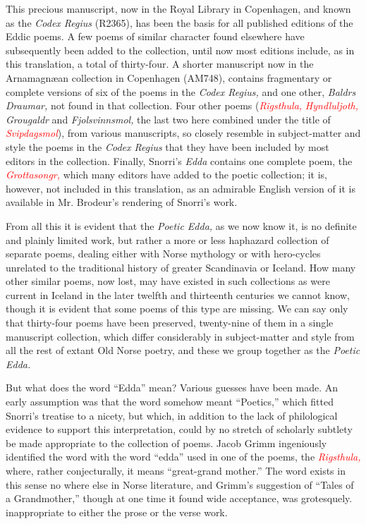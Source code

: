\documentclass{scrbook}
\newcommand{\chapterref}[1]{\textcolor{red}{\emph{#1}}}
\newcommand{\chapterref}[1]{\hyperref[cha:#1]{\emph{#1}}}
\begin{document}
This precious manuscript, now in the Royal Library in Copenhagen, and known as the \emph{Codex Regius} (R2365), has been the basis for all published editions of the Eddic poems. A few poems of similar character found elsewhere have subsequently been added to the collection, until now most editions include, as in this translation, a total of thirty-four. A shorter manuscript now in the Arnamagnæan collection in Copenhagen (AM748), contains fragmentary or complete versions of six of the poems in the \emph{Codex Regius,} and one other, \emph{Baldrs Draumar,} not found in that collection. Four other poems (\chapterref{Rigsthula,} \chapterref{Hyndluljoth,} \emph{Grougaldr} and \emph{Fjolsvinnsmol,} the last two here combined under the title of \chapterref{Svipdagsmol}), from various manuscripts, so closely resemble in subject-matter and style the poems in the \emph{Codex Regius} that they have been included by most editors in the collection. Finally, Snorri's \emph{Edda} contains one complete poem, the \chapterref{Grottasongr,} which many editors have added to the poetic collection; it is, however, not included in this translation, as an admirable English version of it is available in Mr. Brodeur's rendering of Snorri's work.

From all this it is evident that the \emph{Poetic Edda,} as we now know it, is no definite and plainly limited work, but rather a more or less haphazard collection of separate poems, dealing either with Norse mythology or with hero-cycles unrelated to the traditional history of greater Scandinavia or Iceland. How many other similar poems, now lost, may have existed in such collections as were current in Iceland in the later twelfth and thirteenth centuries we cannot know, though it is evident that some poems of this type are missing. We can say only that thirty-four poems have been preserved, twenty-nine of them in a single manuscript collection, which differ considerably in subject-matter and style from all the rest of extant Old Norse poetry, and these we group together as the \emph{Poetic Edda.}

But what does the word ``Edda'' mean? Various guesses have been made. An early assumption was that the word somehow meant ``Poetics,'' which fitted Snorri's treatise to a nicety, but which, in addition to the lack of philological evidence to support this interpretation, could by no stretch of scholarly subtlety be made appropriate to the collection of poems. Jacob Grimm ingeniously identified the word with the word ``edda'' used in one of the poems, the \chapterref{Rigsthula,} where, rather conjecturally, it means ``great-grand mother.'' The word exists in this sense no where else in Norse literature, and Grimm's suggestion of ``Tales of a Grandmother,'' though at one time it found wide acceptance, was grotesquely. inappropriate to either the prose or the verse work.
\end{document}
